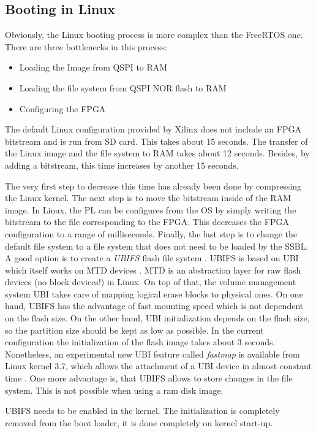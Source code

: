 \subsection{Booting in Linux}
Obviously, the Linux booting process is more complex than the FreeRTOS one. 
There are three bottlenecks in this process:
\begin{itemize}
	\item Loading the Image from \ac{QSPI} to \ac{RAM}
	\item Loading the file system from \ac{QSPI} NOR flash to \ac{RAM}
	\item Configuring the \ac{FPGA}
\end{itemize}
The default Linux configuration provided by Xilinx does not include an \ac{FPGA} bitstream and is run from \ac{SD} card.
This takes about 15 seconds.
The transfer of the Linux image and the file system to \ac{RAM} takes about 12 seconds. 
Besides, by adding a bitstream, this time increases by another 15 seconds.   
\par
The very first step to decrease this time has already been done by compressing the Linux kernel.
The next step is to move the bitstream inside of the RAM image. 
In Linux, the \ac{PL} can be configures from the \ac{OS} by simply writing the bitstream to the file corresponding to the \ac{FPGA}. 
This decreases the \ac{FPGA} configuration to a range of milliseconds. 
Finally, the last step is to change the default file system to a file system that does not need to be loaded by the \ac{SSBL}.
A good option is to create a \textit{\ac{UBIFS}} flash file system \cite{ubifs}.
\ac{UBIFS} is based on \ac{UBI} which itself works on \ac{MTD} devices \cite{mtd}.
\ac{MTD} is an abstraction layer for raw flash devices (no block devices!) in Linux.
On top of that, the volume management system \ac{UBI} takes care of mapping logical erase blocks to physical ones.  
On one hand, \ac{UBIFS} has the advantage of fast mounting speed which is not dependent on the flash size.
On the other hand, \ac{UBI} initialization depends on the flash size, so the partition size should be kept as low as possible.
In the current configuration the initialization of the flash image takes about 3 seconds.
Nonetheless, an experimental new \ac{UBI} feature called \textit{fastmap} is available from Linux kernel 3.7, which allows the attachment of a \ac{UBI} device in almost constant time \cite{ubi}.
One more advantage is, that \ac{UBIFS} allows to store changes in the file system.
This is not possible when using a ram disk image.
\par
\ac{UBIFS} needs to be enabled in the kernel. 
The initialization is completely removed from the boot loader, it is done completely on kernel start-up.

